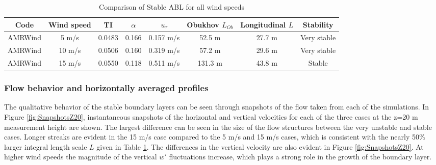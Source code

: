 \begin{table}
\caption{\label{tab:CompareAMRallWS} Comparison of Stable ABL for all
  wind speeds} \centering
\begin{tabular}{cccccccc}
  \hline
  Code & Wind speed   & TI     & $\alpha$& $u_\tau$ & Obukhov $L_{Ob}$ & Longitudinal $L$ & Stability \\
  \hline
  AMRWind & 5 m/s      & 0.0483 &  0.166 &  0.157 m/s  &  52.5 m & 27.7 m  & Very stable\\
  AMRWind & 10 m/s     & 0.0506 &  0.160 &  0.319 m/s  &  57.2 m & 29.6 m  & Very stable\\
  AMRWind & 15 m/s     & 0.0550 &  0.118 &  0.511 m/s  & 131.3 m & 43.8 m  & Stable \\
  \hline
\end{tabular}
\end{table}

\subsubsection{Flow behavior and horizontally averaged profiles}

The qualitative behavior of the stable boundary layers can be seen
through snapshots of the flow taken from each of the simulations.  In
Figure \ref{fig:SnapshotsZ20}, instantaneous snapshots of the
horizontal and vertical velocities for each of the three cases at the
z=20 m measurement height are shown.  The largest difference can be
seen in the size of the flow structures between the very unstable and
stable cases.  Longer streaks are evident in the 15 m/s case compared
to the 5 m/s and 15 m/s cases, which is consistent with the nearly
50\% larger integral length scale $L$ given in Table
\ref{tab:CompareAMRallWS}.  The differences in the vertical velocity
are also evident in Figure  \ref{fig:SnapshotsZ20}.  At higher wind speeds the
magnitude of the vertical $w'$ fluctuations increase, which plays a
strong role in the growth of the boundary layer.

